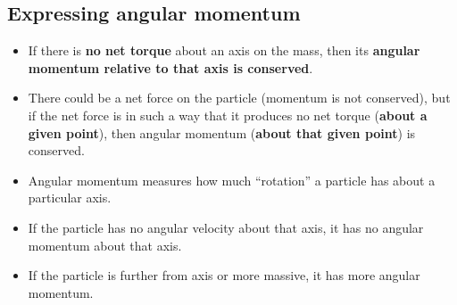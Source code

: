 \documentclass[aspectratio=169,
hyperref={colorlinks,urlcolor=blue}
]{beamer}
\begin{document}
\subsection{Expressing angular momentum}
\label{subsec:}
{
\begin{itemize}
\item If there is \textbf{no net torque} about an axis on the mass, then its \textbf{angular momentum relative to that axis is conserved}.
\item There could be a net force on the particle (momentum is not conserved), but if the net force is in such a way that it produces no net torque (\textbf{about a given point}), then angular momentum (\textbf{about that given point}) is conserved.
\item Angular momentum measures how much ``rotation'' a particle has about a particular axis. 
\item[$\rightarrow$] If the particle has no angular velocity about that axis, it has no angular momentum about that axis.
\item[$\rightarrow$] If the particle is further from axis or more massive, it has more angular momentum.
\end{itemize}
}
{
\begin{center}
\end{center}
}
\end{document}
